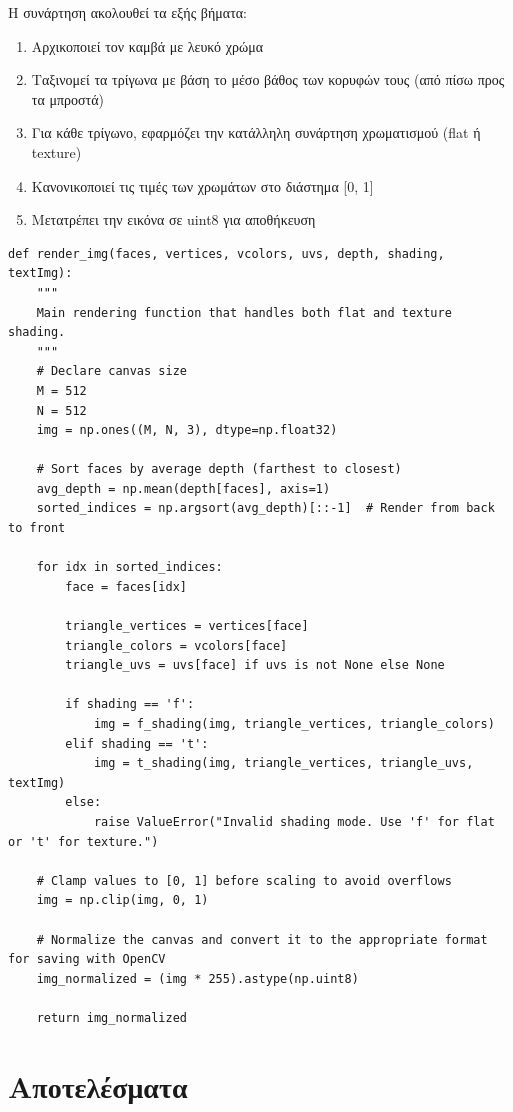 \documentclass{article}
\begin{document}
Η συνάρτηση ακολουθεί τα εξής βήματα:
\begin{enumerate}
  \item Αρχικοποιεί τον καμβά με λευκό χρώμα
  \item Ταξινομεί τα τρίγωνα με βάση το μέσο βάθος των κορυφών τους (από πίσω προς τα μπροστά)
  \item Για κάθε τρίγωνο, εφαρμόζει την κατάλληλη συνάρτηση χρωματισμού (flat ή texture)
  \item Κανονικοποιεί τις τιμές των χρωμάτων στο διάστημα [0, 1]
  \item Μετατρέπει την εικόνα σε uint8 για αποθήκευση
\end{enumerate}

\begin{lstlisting}
def render_img(faces, vertices, vcolors, uvs, depth, shading, textImg):
    """
    Main rendering function that handles both flat and texture shading.
    """
    # Declare canvas size
    M = 512
    N = 512
    img = np.ones((M, N, 3), dtype=np.float32)

    # Sort faces by average depth (farthest to closest)
    avg_depth = np.mean(depth[faces], axis=1)
    sorted_indices = np.argsort(avg_depth)[::-1]  # Render from back to front

    for idx in sorted_indices:
        face = faces[idx]

        triangle_vertices = vertices[face]
        triangle_colors = vcolors[face]
        triangle_uvs = uvs[face] if uvs is not None else None

        if shading == 'f':
            img = f_shading(img, triangle_vertices, triangle_colors)
        elif shading == 't':
            img = t_shading(img, triangle_vertices, triangle_uvs, textImg)
        else:
            raise ValueError("Invalid shading mode. Use 'f' for flat or 't' for texture.")

    # Clamp values to [0, 1] before scaling to avoid overflows
    img = np.clip(img, 0, 1)

    # Normalize the canvas and convert it to the appropriate format for saving with OpenCV
    img_normalized = (img * 255).astype(np.uint8)

    return img_normalized
\end{lstlisting}

\section{Αποτελέσματα}
\end{document}
